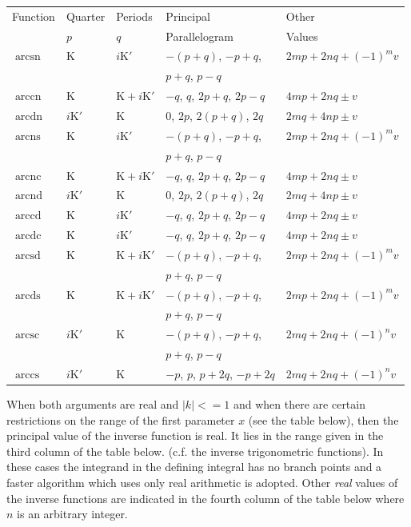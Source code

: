\begin{tabular}{@{}ll@{~}lll}
Function&Quarter&Periods&Principal&Other\\
 &$p$&$q$&Parallelogram&Values\\
\hline
$\mathop{\mathrm{arcsn}}$&$\mathrm{K}$&$i\mathrm{K}'$&
$-(p+q)$, $-p+q$,&$2m p+2n q +(-1)^mv$\\
&&&$p+q$, $p-q$&\\
$\mathop{\mathrm{arccn}}$&$\mathrm{K}$&$\mathrm{K}+i\mathrm{K}'$&
  $-q$, $q$, $2p+q$, $2p-q$&$4m p +2n q \pm v$\\
$\mathop{\mathrm{arcdn}}$&$i\mathrm{K}'$&$\mathrm{K}$&
  $0$, $2p$, $2(p+q)$, $2q$&$2m q+4n p \pm v$\\
$\mathop{\mathrm{arcns}}$&$\mathrm{K}$&$i\mathrm{K}'$&
$-(p+q)$, $-p+q$,&$2m p+2n q +(-1)^mv$\\
&&&$p+q$, $p-q$&\\
$\mathop{\mathrm{arcnc}}$&$\mathrm{K}$&$\mathrm{K}+i\mathrm{K}'$&
  $-q$, $q$, $2p+q$, $2p-q$&$4m p +2n q \pm v$\\
$\mathop{\mathrm{arcnd}}$&$i\mathrm{K}'$&$\mathrm{K}$&
  $0$, $2p$, $2(p+q)$, $2q$&$2m q+4n p \pm v$\\
$\mathop{\mathrm{arccd}}$&$\mathrm{K}$&$i\mathrm{K}'$&
  $-q$, $q$, $2p+q$, $2p-q$&$4m p +2n q \pm v$\\
$\mathop{\mathrm{arcdc}}$&$\mathrm{K}$&$i\mathrm{K}'$&
  $-q$, $q$, $2p+q$, $2p-q$&$4m p +2n q \pm v$\\
$\mathop{\mathrm{arcsd}}$&$\mathrm{K}$&$\mathrm{K}+i\mathrm{K}'$&
$-(p+q)$, $-p+q$,&$2m p +2n q +(-1)^mv$\\
&&&$p+q$, $p-q$&\\
$\mathop{\mathrm{arcds}}$&$\mathrm{K}$&$\mathrm{K}+i\mathrm{K}'$&
$-(p+q)$, $-p+q$,&$2m p +2n q +(-1)^mv$\\
&&&$p+q$, $p-q$&\\
$\mathop{\mathrm{arcsc}}$&$i\mathrm{K}'$&$\mathrm{K}$&
$-(p+q)$, $-p+q$,&$2m q +2n q +(-1)^nv$\\
&&&$p+q$, $p-q$&\\
$\mathop{\mathrm{arccs}}$&$i\mathrm{K}'$&$\mathrm{K}$&
  $-p$, $p$, $p+2q$, $-p+2q$&$2m q +2n q +(-1)^nv$\\
\end{tabular}

When both arguments are real and $|k|<=1$ and when there are certain
restrictions on the range of the first parameter $x$ (see the
table below), then the principal value of the inverse function is
real. It lies in the range  given in the third column of the table
below. (c.f. the inverse trigonometric functions). In these cases the integrand
in the defining integral has no branch points and a faster algorithm which
uses only real arithmetic is adopted. Other \emph{real}
values of the inverse functions are indicated in the fourth column
of the table below where $n$ is an arbitrary integer.

